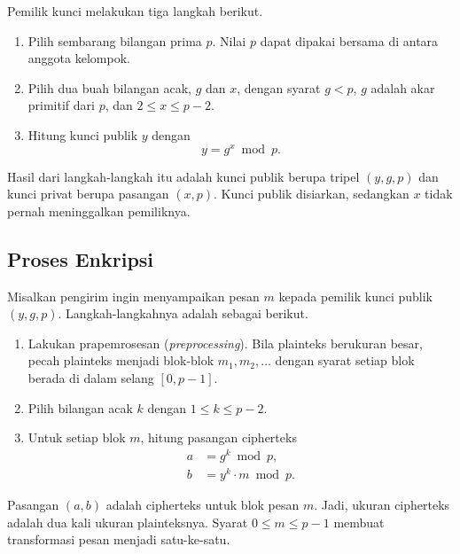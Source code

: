 Pemilik kunci melakukan tiga langkah berikut.

\begin{enumerate}
    \item Pilih sembarang bilangan prima $p$. Nilai $p$ dapat dipakai bersama
          di antara anggota kelompok.
    \item Pilih dua buah bilangan acak, $g$ dan $x$, dengan syarat $g < p$,
          $g$ adalah akar primitif dari $p$, dan $2 \le x \le p - 2$.
    \item Hitung kunci publik $y$ dengan
    \begin{equation}
    y = g^{x} \bmod p .
    \label{eq:elgamal-kunci}
    \end{equation}
\end{enumerate}

Hasil dari langkah-langkah itu adalah kunci publik berupa tripel $(y, g, p)$
dan kunci privat berupa pasangan $(x, p)$. Kunci publik disiarkan, sedangkan
$x$ tidak pernah meninggalkan pemiliknya.

\subsection{Proses Enkripsi}

Misalkan pengirim ingin menyampaikan pesan $m$ kepada pemilik kunci publik
$(y, g, p)$. Langkah-langkahnya adalah sebagai berikut.

\begin{enumerate}
    \item Lakukan prapemrosesan (\textit{preprocessing}). Bila plainteks
          berukuran besar, pecah plainteks menjadi blok-blok
          $m_{1}, m_{2}, \dots$ dengan syarat setiap blok berada di dalam
          selang $[0, p-1]$.
    \item Pilih bilangan acak $k$ dengan $1 \le k \le p - 2$.
    \item Untuk setiap blok $m$, hitung pasangan cipherteks
    \begin{align}
    a &= g^{k} \bmod p , \label{eq:elgamal-a} \\
    b &= y^{k} \cdot m \bmod p . \label{eq:elgamal-b}
    \end{align}
\end{enumerate}

Pasangan $(a, b)$ adalah cipherteks untuk blok pesan $m$. Jadi, ukuran
cipherteks adalah dua kali ukuran plainteksnya. Syarat $0 \le m \le p-1$
membuat transformasi pesan menjadi satu-ke-satu.

